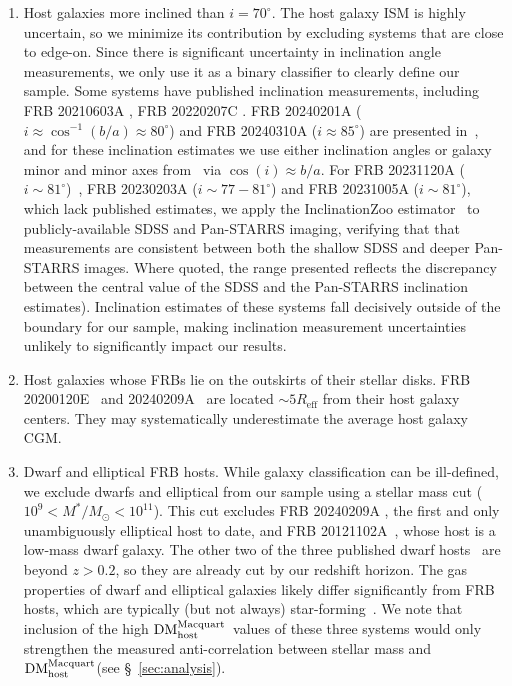 \documentclass[twocolumn,linenumbers]{aastex631}
\newcommand{\dmhm}{\ensuremath{{\rm DM}_\textrm{host}^\textrm{Macquart}}}
\begin{document}
\begin{enumerate}
    For galaxy groups, we cross-match our hosts with~\citet{tully2015galaxy}, but are limited by its stringent redshift horizon of $<10000$ km/s. However, we exclude the galaxy-merger host of FRB 20190303A (noting that its \dmhm\ is not anomalously large).
    \item Host galaxies more inclined than $i = 70^\circ$. The host galaxy ISM is highly uncertain, so we minimize its contribution by excluding systems that are close to edge-on. Since there is significant uncertainty in inclination angle measurements, we only use it as a binary classifier to clearly define our sample. Some systems have published inclination measurements, including FRB 20210603A \citep[$i \approx 83^\circ$; ][]{cassanelli2024fast}, FRB 20220207C \citep[$i \approx 74-80^\circ$;][]{law2024deep,bhardwaj2024selection}. FRB 20240201A ($i \approx \cos^{-1}(b/a) \approx 80^\circ$) and FRB 20240310A ($i \approx 85^\circ$) are presented in~\citet{shannon2024commensal,gordon2025mapping}, and for these inclination estimates we use either inclination angles or galaxy minor and minor axes from~\citet{glowacki2025investigation} via $\cos(i) \approx b/a$. 
    For FRB 20231120A ($i \sim 81^\circ$)~\citep{sharma2024preferential}, FRB 20230203A ($i \sim 77-81^\circ$) and FRB 20231005A ($i \sim 81^\circ$), which lack published estimates, we apply the InclinationZoo estimator~\citep{kourkchi2020cosmicflows} to publicly-available SDSS and Pan-STARRS imaging, verifying that that measurements are consistent between both the shallow SDSS and deeper Pan-STARRS images. Where quoted, the range presented reflects the discrepancy between the central value of the SDSS and the Pan-STARRS inclination estimates). Inclination estimates of these systems fall decisively outside of the boundary for our sample, making inclination measurement uncertainties unlikely to significantly impact our results. 
    \item Host galaxies whose FRBs lie on the outskirts of their stellar disks. FRB 20200120E~\citep{bhardwaj2021nearby, kirsten2022repeating} and 20240209A~\citep{shah2024repeating} are located $\sim 5 R_\mathrm{eff}$ from their host galaxy centers. They may systematically underestimate the average host galaxy CGM.
    \item Dwarf and elliptical FRB hosts. While galaxy classification can be ill-defined, we exclude dwarfs and elliptical from our sample using a stellar mass cut ($10^9 < M^*/M_\odot < 10^{11}$). This cut excludes FRB 20240209A \citep{eftekhari2024massive}, the first and only unambiguously elliptical host to date, and FRB 20121102A~\citep{spitler2016repeating,tendulkar2017host}, whose host is a low-mass dwarf galaxy. The other two of the three published dwarf hosts~\citep[FRB 20190520B \& 20210117A][]{bhandari2023nonrepeating,hewitt2024repeating} are beyond $z > 0.2$, so they are already cut by our redshift horizon. The gas properties of dwarf and elliptical galaxies likely differ significantly from FRB hosts, which are typically (but not always) star-forming~\citep{bhandari2020host,glowacki2023wallaby,sharma2023deep}. We note that inclusion of the high \dmhm\ values of these three systems would only strengthen the measured anti-correlation between stellar mass and \dmhm (see \S~\ref{sec:analysis}).

\end{enumerate}
\end{document}
